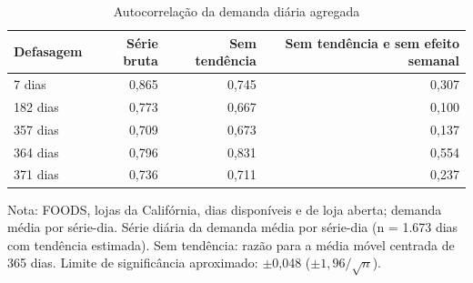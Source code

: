 \begin{table}[htbp]
\centering
\small
\caption{Autocorrelação da demanda diária agregada}
\label{tab:saz_autocorrelacao}
\begin{tabular}{lrrr}
\toprule
Defasagem & Série bruta & Sem tendência & Sem tendência e sem efeito semanal \\
\midrule
7 dias & 0,865 & 0,745 & 0,307 \\
182 dias & 0,773 & 0,667 & 0,100 \\
357 dias & 0,709 & 0,673 & 0,137 \\
364 dias & 0,796 & 0,831 & 0,554 \\
371 dias & 0,736 & 0,711 & 0,237 \\
\bottomrule
\end{tabular}
\par\smallskip
{\footnotesize Nota: FOODS, lojas da Califórnia, dias disponíveis e de loja aberta; demanda média por série-dia. Série diária da demanda média por série-dia (n = 1.673 dias com tendência estimada). Sem tendência: razão para a média móvel centrada de 365 dias. Limite de significância aproximado: $\pm$0,048 ($\pm 1{,}96/\sqrt{n}$).}
\end{table}
